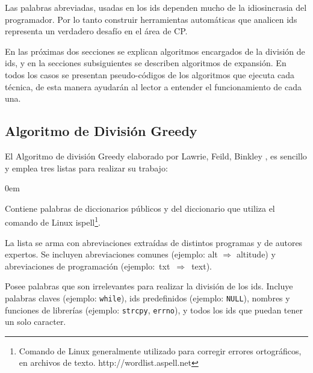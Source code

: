 Las palabras abreviadas, usadas en los ids dependen mucho de la idiosincrasia del programador. Por lo tanto construir herramientas automáticas que analicen ids representa un verdadero desafío en el área de CP.

En las próximas dos secciones se explican algoritmos encargados de la división de ids, y en la secciones subsiguientes se describen algoritmos de expansión. En todos los casos se presentan pseudo-códigos de los algoritmos que ejecuta cada técnica, de esta manera ayudarán al lector a entender el funcionamiento de cada una.


\subsection{Algoritmo de División Greedy}
\label{sec:algGre}

El Algoritmo de división Greedy elaborado por Lawrie, Feild, Binkley \cite{DLFB06,FBL06,HDD06,LFBEX07,EHPV09}, es sencillo y emplea tres listas para realizar su trabajo:

\begin{description}
\itemsep0em%
\item[Palabras de diccionarios:] Contiene palabras de diccionarios públicos y del diccionario que utiliza el comando de Linux \textsf{ispell}\footnote[1]{Comando de Linux generalmente utilizado para corregir errores ortográficos, en archivos de texto. http://wordlist.aspell.net}.

\item[Abreviaciones conocidas:] La lista se arma con abreviaciones extraídas de distintos programas y de autores expertos. Se incluyen abreviaciones comunes (ejemplo: \textsf{alt} $\Rightarrow$ \textsf{altitude}) y abreviaciones de programación \mbox{(ejemplo: \textsf{txt} $\Rightarrow$ \textsf{text}).}

\item[Palabras excluyentes (stop list):] Posee palabras que son irrelevantes para realizar la división de los ids. Incluye palabras claves (ejemplo: \texttt{while}), ids predefinidos (ejemplo: \texttt{NULL}), nombres y funciones de librerías (ejemplo: \texttt{strcpy}, \texttt{errno}), y todos los ids que puedan tener un solo caracter.
\end{description}

